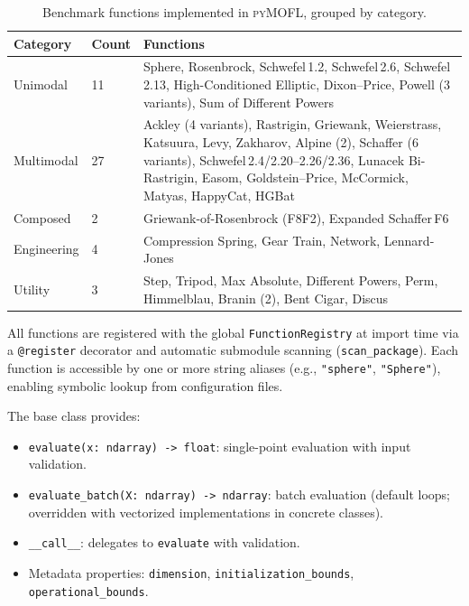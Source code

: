 \documentclass[11pt,a4paper]{article}
\newcommand{\pymofl}{\textsc{pyMOFL}}
\begin{document}
\begin{table}[t]
\centering
\caption{Benchmark functions implemented in \pymofl{}, grouped by category.}
\label{tab:functions}
\small
\begin{tabular}{@{}llp{8.5cm}@{}}
\toprule
\textbf{Category} & \textbf{Count} & \textbf{Functions} \\
\midrule
Unimodal & 11 &
  Sphere, Rosenbrock, Schwefel\,1.2, Schwefel\,2.6, Schwefel\,2.13,
  High-Conditioned Elliptic, Dixon--Price, Powell (3 variants),
  Sum of Different Powers \\
\addlinespace
Multimodal & 27 &
  Ackley (4 variants), Rastrigin, Griewank, Weierstrass, Katsuura, Levy,
  Zakharov, Alpine (2), Schaffer (6 variants), Schwefel\,2.4/2.20--2.26/2.36,
  Lunacek Bi-Rastrigin, Easom, Goldstein--Price, McCormick, Matyas,
  HappyCat, HGBat \\
\addlinespace
Composed & 2 &
  Griewank-of-Rosenbrock (F8F2), Expanded Schaffer\,F6 \\
\addlinespace
Engineering & 4 &
  Compression Spring, Gear Train, Network, Lennard-Jones \\
\addlinespace
Utility & 3 &
  Step, Tripod, Max Absolute, Different Powers, Perm, Himmelblau, Branin (2),
  Bent Cigar, Discus \\
\bottomrule
\end{tabular}
\end{table}

All functions are registered with the global \texttt{FunctionRegistry} at
import time via a \texttt{@register} decorator and automatic submodule scanning
(\texttt{scan\_package}). Each function is accessible by one or more string
aliases (e.g., \texttt{"sphere"}, \texttt{"Sphere"}), enabling symbolic lookup
from configuration files.

The base class provides:
\begin{itemize}[nosep]
  \item \texttt{evaluate(x: ndarray) -> float}: single-point evaluation with input validation.
  \item \texttt{evaluate\_batch(X: ndarray) -> ndarray}: batch evaluation (default loops; overridden with vectorized implementations in concrete classes).
  \item \texttt{\_\_call\_\_}: delegates to \texttt{evaluate} with validation.
  \item Metadata properties: \texttt{dimension}, \texttt{initialization\_bounds}, \texttt{operational\_bounds}.
\end{itemize}
\end{document}
